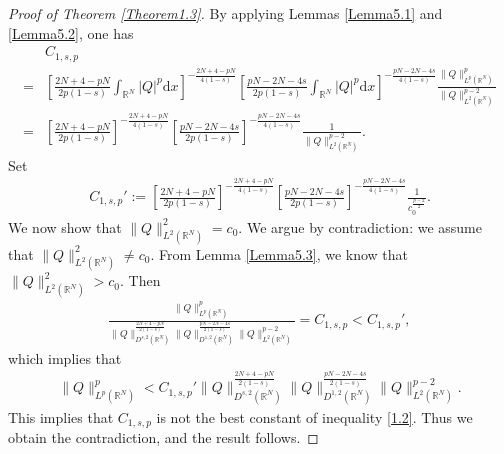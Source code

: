 \documentclass[12pt,a4paper,reqno]{amsart}
\numberwithin{equation}{section}
\begin{document}
\begin{proof}[Proof of Theorem \ref{Theorem1.3}]
By applying Lemmas \ref{Lemma5.1} and \ref{Lemma5.2}, one has
\begin{equation*}
\begin{aligned}
&C_{1,s,p}\\
=&
\left[
\frac{2N+4-pN}{2p(1-s)}
\int_{\mathbb{R}^{N}}|Q|^{p}\mathrm{d}x
\right]^{-\frac{2N+4-pN}{4(1-s)}}
\left[
\frac{pN-2N-4s}{2p(1-s)}\int_{\mathbb{R}^{N}}|Q|^{p}\mathrm{d}x
\right]^{-\frac{pN-2N-4s}{4(1-s)}}
\frac
{\|Q\|_{L^{p}(\mathbb{R}^{N})}^{p}}
{
\|Q\|_{L^{2}(\mathbb{R}^{N})}^{p-2}
}\\
=&\left[
\frac{2N+4-pN}{2p(1-s)}
\right]^{-\frac{2N+4-pN}{4(1-s)}}
\left[
\frac{pN-2N-4s}{2p(1-s)}
\right]^{-\frac{pN-2N-4s}{4(1-s)}}
\frac{1}{\|Q\|_{L^{2}(\mathbb{R}^{N})}^{p-2}}.
\end{aligned}
\end{equation*}
Set
\begin{equation*}
\begin{aligned}
C_{1,s,p}':=\left[
\frac{2N+4-pN}{2p(1-s)}
\right]^{-\frac{2N+4-pN}{4(1-s)}}
\left[
\frac{pN-2N-4s}{2p(1-s)}
\right]^{-\frac{pN-2N-4s}{4(1-s)}}
\frac{1}{c_{0}^{\frac{p-2}{2}}}.
\end{aligned}
\end{equation*}
We now show that $\|Q\|_{L^{2}(\mathbb{R}^{N})}^{2}=c_{0}$.
We argue by contradiction:
we assume that
$\|Q\|_{L^{2}(\mathbb{R}^{N})}^{2}\not=c_{0}$.
From Lemma \ref{Lemma5.3},
we know that
$\|Q\|_{L^{2}(\mathbb{R}^{N})}^{2}>c_{0}$.
Then
\begin{equation*}
\begin{aligned}
\frac{\|Q\|_{L^{p}(\mathbb{R}^{N})}^{p}}
{\|Q\|_{D^{s,2}(\mathbb{R}^{N})}^{\frac{2N+4-pN}{2(1-s)}}
\|Q\|_{D^{1,2}(\mathbb{R}^{N})}^{\frac{pN-2N-4s}{2(1-s)}}
\|Q\|_{L^{2}(\mathbb{R}^{N})}^{p-2}}=C_{1,s,p}
<C_{1,s,p}',
\end{aligned}
\end{equation*}
which implies that
\begin{equation*}
\begin{aligned}
\|Q\|_{L^{p}(\mathbb{R}^{N})}^{p}
<C_{1,s,p}'\|Q\|_{D^{s,2}(\mathbb{R}^{N})}^{\frac{2N+4-pN}{2(1-s)}}
\|Q\|_{D^{1,2}(\mathbb{R}^{N})}^{\frac{pN-2N-4s}{2(1-s)}}
\|Q\|_{L^{2}(\mathbb{R}^{N})}^{p-2}.
\end{aligned}
\end{equation*}
This implies that $C_{1,s,p}$ is not the best constant of inequality \eqref{1.2}.
Thus we obtain the contradiction, and the result follows.
\end{proof}
\end{document}
